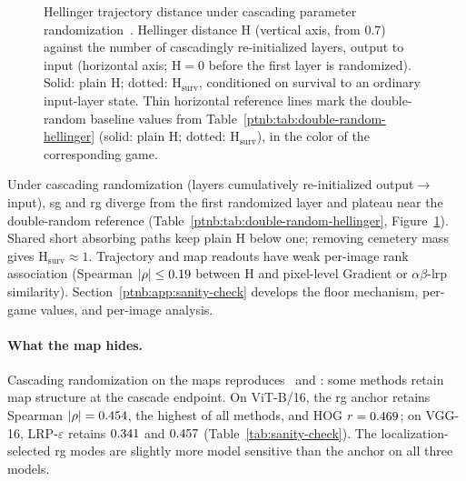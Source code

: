 \begin{figure}[t]
    \centering
    
    \caption[Hellinger trajectory distance under parameter randomization]{Hellinger trajectory distance under cascading parameter
    randomization~\parencite{Adebayo2018sanity}. Hellinger distance $\mathrm{H}$ (vertical axis, from
    $0.7$) against the number of cascadingly re-initialized layers, output to input (horizontal axis;
    $\mathrm{H}=0$ before the first layer is randomized). Solid: plain $\mathrm{H}$; dotted:
    $\mathrm{H}_{\mathrm{surv}}$, conditioned on survival to an ordinary input-layer state. Thin
    horizontal reference lines mark the double-random baseline values from
    Table~\ref{ptnb:tab:double-random-hellinger} (solid: plain $\mathrm{H}$; dotted:
    $\mathrm{H}_{\mathrm{surv}}$), in the color of the corresponding game.}
    \label{ptnb:fig:hellinger-sanity}
\end{figure}

Under cascading randomization (layers cumulatively re-initialized output$\to$input), \ac{sg} and \ac{rg} diverge from the first randomized layer and plateau near the double-random reference (Table~\ref{ptnb:tab:double-random-hellinger}, Figure~\ref{ptnb:fig:hellinger-sanity}). Shared short absorbing paths keep plain $\mathrm H$ below one; removing cemetery mass gives $\mathrm H_{\mathrm{surv}}\approx1$. Trajectory and map readouts have weak per-image rank association (Spearman $|\rho|\le0.19$ between $\mathrm H$ and pixel-level Gradient or $\alpha\beta$-\ac{lrp} similarity). Section~\ref{ptnb:app:sanity-check} develops the floor mechanism, per-game values, and per-image analysis.

\paragraph{What the map hides.}\label{ptnb:sec:pixel-sanity}
Cascading randomization on the maps reproduces~\textcite{Adebayo2018sanity} and \textcite{sixt2020whenexplanationslie}: some methods retain map structure at the cascade endpoint. On ViT-B/16, the \ac{rg} anchor retains Spearman $|\rho| = 0.454$, the highest of all methods, and HOG $r = 0.469$; on VGG-16, LRP-$\varepsilon$ retains $0.341$ and $0.457$ (Table~\ref{tab:sanity-check}). The localization-selected \ac{rg} modes are slightly more model sensitive than the anchor on all three models. 
